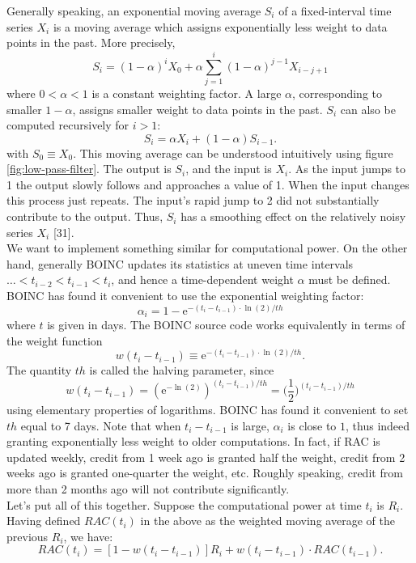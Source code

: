Generally speaking, an exponential moving average $S_i$ of a fixed-interval time series $X_i$ is a moving average which assigns exponentially less weight to data points in the past. More precisely,
\begin{equation}
S_i = (1-\alpha)^i X_0 + \alpha \sum_{j = 1}^i (1-\alpha)^{j-1} X_{i-j+1}
\label{eq1}
\end{equation} 
where $0 < \alpha < 1$ is a constant weighting factor. A large $\alpha$, corresponding to smaller $1-\alpha$, assigns smaller weight to data points in the past. $S_i$ can also be computed recursively for $i > 1$:
\begin{equation}
S_i = \alpha X_i + (1-\alpha) S_{i-1}.
\end{equation}
with $S_0 \equiv X_0$. This moving average can be understood intuitively using figure \ref{fig:low-pass-filter}. The output is $S_i$, and the input is $X_i$. As the input jumps to 1 the output slowly follows and approaches a value of 1. When the input changes this process just repeats. The input’s rapid jump to 2 did not substantially contribute to the output. Thus, $S_i$ has a smoothing effect on the relatively noisy series $X_i$ [31]. \\
We want to implement something similar for computational power. On the other hand, generally BOINC updates its statistics at uneven time intervals $\ldots <  t_{i-2} < t_{i-1} < t_i$, and hence a time-dependent weight $\alpha$ must be defined. BOINC has found it convenient to use the exponential weighting factor:
\begin{equation}
\alpha_i = 1 - \mathrm{e}^{-(t_i-t_{i-1}) \cdot  \ln(2) / th}  
\end{equation}
where $t$ is given in days. The BOINC source code works equivalently in terms of the weight function 
\begin{equation}
w(t_i - t_{i-1}) \equiv \mathrm{e}^{-(t_i-t_{i-1}) \cdot  \ln(2) / th}.
\end{equation}
 The quantity $th$ is called the halving parameter, since
\begin{equation}
w(t_i - t_{i-1})  =  \left( \mathrm{e}^{-\ln(2)} \right)^{(t_i-t_{i-1})/th} = \bigg(\frac{1}{2}\bigg)^{(t_i-t_{i-1})/th}
\end{equation}
using elementary properties of logarithms. BOINC has found it convenient to set $th$ equal to 7 days. Note that when $t_i - t_{i-1}$ is large, $\alpha_i$ is close to $1$, thus indeed granting exponentially less weight to older computations. In fact, if RAC is updated weekly, credit from 1 week ago is granted half the weight, credit from 2 weeks ago is granted one-quarter the weight, etc. Roughly speaking, credit from more than 2 months ago will not contribute significantly. \\
Let's put all of this together. Suppose the computational power at time $t_i$ is $R_i$. Having defined $RAC(t_i)$ in the above as the weighted moving average of the previous $R_i$, we have:
\begin{equation}
RAC(t_i) = \left[1 - w(t_i - t_{i-1})\right] R_i + w(t_i - t_{i-1}) \cdot RAC(t_{i-1}).
\end{equation}

